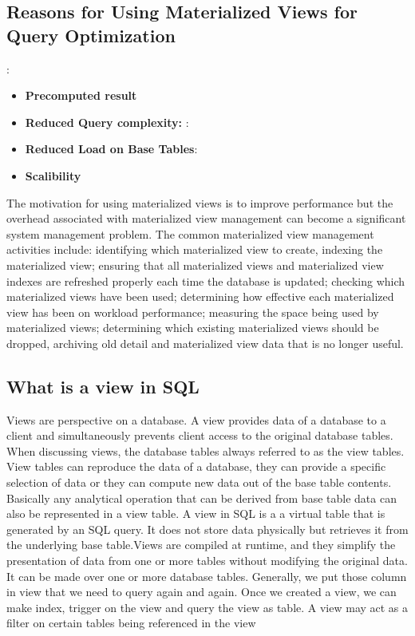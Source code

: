 \subsection{Reasons for Using Materialized Views for Query Optimization}:
\begin{itemize}
    \item\textbf{Precomputed result}
    \item\textbf{Reduced Query complexity:} :
    \item\textbf{Reduced Load on Base Tables}:
    \item\textbf{Scalibility}
\end{itemize}
The motivation for using materialized views is to improve performance but the overhead associated with materialized view management can become a significant system management problem. The common materialized view management activities include: identifying which materialized view to create, indexing the materialized view; ensuring that all materialized views and materialized view indexes are refreshed properly each time the database is updated; checking which materialized views have been used; determining how effective each materialized view has been on workload performance; measuring the space being used by materialized views; determining which existing materialized views should be dropped,  archiving old detail and materialized view data that is no longer useful.\cite{Ashadevi2008CostEA,1363763}

\subsection{What is a view in SQL}
Views are perspective on a database. A view provides data of a database to a client and simultaneously prevents client access to the original database tables. When discussing views, the database tables always referred to as the view tables. View tables can reproduce the data of a database, they can provide a specific selection of data or they can compute new data out of the base table contents. Basically any analytical operation that can be derived from base table data can also be represented in a view table. A view in SQL is a a virtual table that is generated by an SQL query. It does not store data physically but retrieves it from the underlying base table.Views are compiled at runtime, and they simplify the presentation of data from one or more tables without modifying the original data. It can be made over one or more database tables. Generally, we put those column in view that we need to query again and again. Once we created a view, we can make index, trigger on the view and query the view as table. A view may act as a filter on certain tables being referenced in the view \cite{chauhan-2024,Rohan_Vats-2024}

